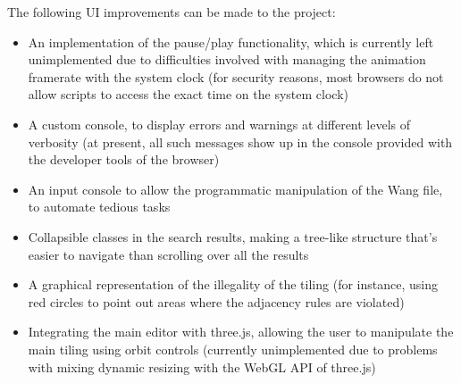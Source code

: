 \documentclass[letterpaper,11pt]{article}
\begin{document}
The following UI improvements can be made to the project:

\begin{itemize}
	\item An implementation of the pause/play functionality, which is currently left unimplemented due to difficulties involved with managing the animation framerate with the system clock (for security reasons, most browsers do not allow scripts to access the exact time on the system clock)
	\item A custom console, to display errors and warnings at different levels of verbosity (at present, all such messages show up in the console provided with the developer tools of the browser)
	\item An input console to allow the programmatic manipulation of the Wang file, to automate tedious tasks
	\item Collapsible classes in the search results, making a tree-like structure that's easier to navigate than scrolling over all the results
	\item A graphical representation of the illegality of the tiling (for instance, using red circles to point out areas where the adjacency rules are violated)
	\item Integrating the main editor with three.js, allowing the user to manipulate the main tiling using orbit controls (currently unimplemented due to problems with mixing dynamic resizing with the WebGL API of three.js)
\end{itemize}



\end{document}
